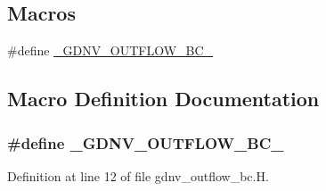 \subsection*{Macros}
\begin{DoxyCompactItemize}
\item 
\#define \hyperlink{gdnv__outflow__bc_8H_a17f1307a315caab4e791932751870197}{\+\_\+\+G\+D\+N\+V\+\_\+\+O\+U\+T\+F\+L\+O\+W\+\_\+\+B\+C\+\_\+}
\end{DoxyCompactItemize}


\subsection{Macro Definition Documentation}
\subsubsection[{\texorpdfstring{\+\_\+\+G\+D\+N\+V\+\_\+\+O\+U\+T\+F\+L\+O\+W\+\_\+\+B\+C\+\_\+}{_GDNV_OUTFLOW_BC_}}]{\setlength{\rightskip}{0pt plus 5cm}\#define \+\_\+\+G\+D\+N\+V\+\_\+\+O\+U\+T\+F\+L\+O\+W\+\_\+\+B\+C\+\_\+}\hypertarget{gdnv__outflow__bc_8H_a17f1307a315caab4e791932751870197}{}\label{gdnv__outflow__bc_8H_a17f1307a315caab4e791932751870197}


Definition at line 12 of file gdnv\+\_\+outflow\+\_\+bc.\+H.

